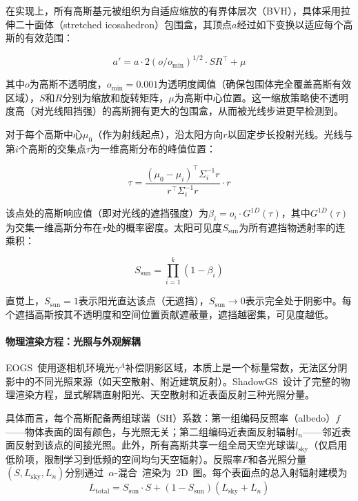 在实现上，所有高斯基元被组织为自适应缩放的有界体层次（BVH），具体采用拉伸二十面体（stretched icosahedron）包围盒，其顶点$a$经过如下变换以适应每个高斯的有效范围：

\begin{equation}
a' = a \cdot 2(o / o_{\min})^{1/2} \cdot S R^\top + \mu
\end{equation}

其中$o$为高斯不透明度，$o_{\min} = 0.001$为透明度阈值（确保包围体完全覆盖高斯有效区域），$S$和$R$分别为缩放和旋转矩阵，$\mu$为高斯中心位置。这一缩放策略使不透明度高（对光线阻挡强）的高斯拥有更大的包围盒，从而被光线步进更早检测到。

对于每个高斯中心$\mu_0$（作为射线起点），沿太阳方向$r$以固定步长投射光线。光线与第$i$个高斯的交集点$\tau$为一维高斯分布的峰值位置：

\begin{equation}
\tau = \frac{(\mu_0 - \mu_i)^\top \Sigma_i^{-1} r}{r^\top \Sigma_i^{-1} r} \cdot r
\end{equation}

该点处的高斯响应值（即对光线的遮挡强度）为$\beta_i = o_i \cdot G^{1D}(\tau)$，其中$G^{1D}(\tau)$为交集一维高斯分布在$\tau$处的概率密度。太阳可见度$S_{\text{sun}}$为所有遮挡物透射率的连乘积：

\begin{equation}
S_{\text{sun}} = \prod_{i=1}^{k}(1 - \beta_i)
\end{equation}

直觉上，$S_{\text{sun}} = 1$表示阳光直达该点（无遮挡），$S_{\text{sun}} \to 0$表示完全处于阴影中。每个遮挡高斯按其不透明度和空间位置贡献遮蔽量，遮挡越密集，可见度越低。

\paragraph{物理渲染方程：光照与外观解耦} EOGS~使用逐相机环境光$\gamma^A$补偿阴影区域，本质上是一个标量常数，无法区分阴影中的不同光照来源（如天空散射、附近建筑反射）。ShadowGS~设计了完整的物理渲染方程，显式解耦直射阳光、天空散射和近表面反射三种光照分量。

具体而言，每个高斯配备两组球谐（SH）系数：第一组编码反照率（albedo）$f$——物体表面的固有颜色，与光照无关；第二组编码近表面反射辐射$l_n$——邻近表面反射到该点的间接光照。此外，所有高斯共享一组全局天空光球谐$l_{\text{sky}}$（仅启用低阶项，限制学习到低频的空间均匀天空辐射）。反照率$F$和各光照分量$(S, L_{\text{sky}}, L_n)$分别通过~$\alpha$-混合~渲染为~2D~图。每个表面点的总入射辐射建模为
\begin{equation}
L_{\text{total}} = S_{\text{sun}} \cdot S + (1 - S_{\text{sun}})(L_{\text{sky}} + L_n)
\end{equation}

